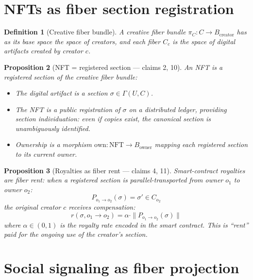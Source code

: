 \documentclass[11pt,a4paper]{article}
\newtheorem{definition}{Definition}[section]
\newtheorem{proposition}[definition]{Proposition}
\begin{document}
\section{NFTs as fiber section registration}

\begin{definition}[Creative fiber bundle]
A \emph{creative fiber bundle} $\pi_C : C \to B_{\text{creator}}$ has
as its base space the space of creators, and each fiber $C_c$ is the
space of digital artifacts created by creator $c$.
\end{definition}

\begin{proposition}[NFT = registered section --- claims 2, 10]
\label{prop:nft}
An NFT is a \emph{registered section} of the creative fiber bundle:
\begin{itemize}
  \item The digital artifact is a section $\sigma \in \Gamma(U, C)$.
  \item The NFT is a public registration of $\sigma$ on a distributed
    ledger, providing section individuation: even if copies exist, the
    canonical section is unambiguously identified.
  \item Ownership is a morphism $\text{own}: \text{NFT} \to B_{\text{owner}}$
    mapping each registered section to its current owner.
\end{itemize}
\end{proposition}

\begin{proposition}[Royalties as fiber rent --- claims 4, 11]
\label{prop:royalties}
Smart-contract royalties are fiber rent: when a registered section is
parallel-transported from owner $o_1$ to owner $o_2$:
\[
  P_{o_1 \to o_2}(\sigma) = \sigma' \in C_{o_2}
\]
the original creator $c$ receives compensation:
\[
  r(\sigma, o_1 \to o_2) = \alpha \cdot \|P_{o_1 \to o_2}(\sigma)\|
\]
where $\alpha \in (0,1)$ is the royalty rate encoded in the smart contract.
This is ``rent'' paid for the ongoing use of the creator's section.
\end{proposition}

\section{Social signaling as fiber projection}
\end{document}
